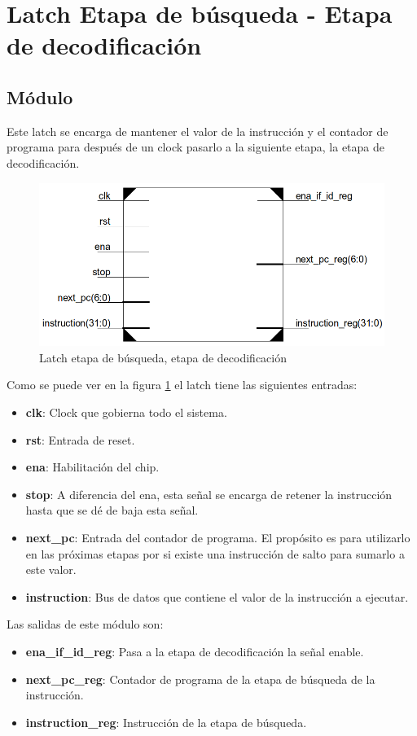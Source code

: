 \newpage
\section{Latch Etapa de b\'usqueda - Etapa de decodificaci\'on}
\subsection{M\'odulo}
Este latch se encarga de mantener el valor de la instrucci\'on y el contador de programa para despu\'es de un clock pasarlo a la siguiente etapa, la etapa de decodificaci\'on.

\begin{figure}[H]
\centering
\includegraphics[scale=0.35]{img/latch_if_id}
\caption{Latch etapa de b\'usqueda, etapa de decodificaci\'on}
\label{fig:latchifid}
\end{figure}

Como se puede ver en la figura \ref{fig:latchifid} el latch tiene las siguientes entradas:
\begin{itemize}
  \item \textbf{clk}: Clock que gobierna todo el sistema.
  \item \textbf{rst}: Entrada de reset.
  \item \textbf{ena}: Habilitaci\'on del chip.
  \item \textbf{stop}: A diferencia del ena, esta señal se encarga de retener la instrucci\'on hasta que se d\'e de baja esta señal.
  \item \textbf{next\_pc}: Entrada del contador de programa. El prop\'osito es para utilizarlo en las pr\'oximas etapas por si existe una instrucci\'on de salto para sumarlo a este valor.
  \item \textbf{instruction}: Bus de datos que contiene el valor de la instrucci\'on a ejecutar.  
\end{itemize}

Las salidas de este m\'odulo son:
\begin{itemize}
  \item \textbf{ena\_if\_id\_reg}: Pasa a la etapa de decodificaci\'on la señal enable.
  \item \textbf{next\_pc\_reg}: Contador de programa de la etapa de b\'usqueda de la instrucci\'on.
  \item \textbf{instruction\_reg}: Instrucci\'on de la etapa de b\'usqueda.
\end{itemize}